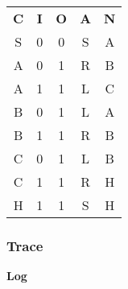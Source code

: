 \documentclass[10pt,a4paper]{article}
\begin{document}
\newcommand\tb[1] {\textbf{#1}}
\newcommand\e[1] {\colorbox{amber}{\bf #1}}

\vskip 4pt
%
\begin{table}[H]
  \begin{center}
    \begin{tabular}{|c|c|c|c|c|}
      \hline
      \tb{C} & \tb{I} & \tb{O} & \tb{A} & \tb{N}\\ %
      S & 0 & 0 & S & A \\ %
      \hline
      A & 0 & 1 & R & B \\ %
      A & 1 & 1 & L & C \\ %
      \hline
      B & 0 & 1 & L & A \\ %
      B & 1 & 1 & R & B \\ %
      \hline
      C & 0 & 1 & L & B \\ %
      C & 1 & 1 & R & H \\ %
      \hline
      H & 1 & 1 & S & H \\ %
      \hline
    \end{tabular}
  \end{center}
\end{table}


\subsubsection{Trace}

\vskip 16pt
{\bf Log}
       
\end{document}
